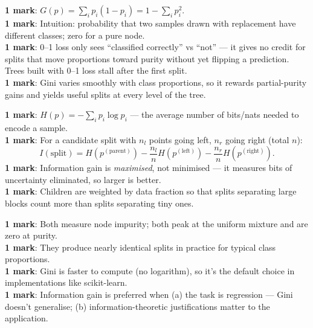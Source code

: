 \documentclass[11pt, a4paper]{article}
\begin{document}
\begin{exambox}
\textbf{1 mark}: $G(p) = \sum_i p_i(1 - p_i) = 1 - \sum_i p_i^2$. \\
\textbf{1 mark}: Intuition: probability that two samples drawn with replacement have different classes; zero for a pure node. \\
\textbf{1 mark}: 0--1 loss only sees ``classified correctly'' vs ``not'' — it gives no credit for splits that move proportions toward purity without yet flipping a prediction. Trees built with 0--1 loss stall after the first split. \\
\textbf{1 mark}: Gini varies smoothly with class proportions, so it rewards partial-purity gains and yields useful splits at every level of the tree.
\end{exambox}

\begin{exambox}
\textbf{1 mark}: $H(p) = -\sum_i p_i \log p_i$ — the average number of bits/nats needed to encode a sample. \\
\textbf{1 mark}: For a candidate split with $n_l$ points going left, $n_r$ going right (total $n$):
\[
I(\text{split}) = H(p^{(\text{parent})}) - \frac{n_l}{n} H(p^{(\text{left})}) - \frac{n_r}{n} H(p^{(\text{right})}).
\]
\textbf{1 mark}: Information gain is \emph{maximised}, not minimised — it measures bits of uncertainty eliminated, so larger is better. \\
\textbf{1 mark}: Children are weighted by data fraction so that splits separating large blocks count more than splits separating tiny ones.
\end{exambox}

\begin{exambox}
\textbf{1 mark}: Both measure node impurity; both peak at the uniform mixture and are zero at purity. \\
\textbf{1 mark}: They produce nearly identical splits in practice for typical class proportions. \\
\textbf{1 mark}: Gini is faster to compute (no logarithm), so it's the default choice in implementations like scikit-learn. \\
\textbf{1 mark}: Information gain is preferred when (a) the task is regression — Gini doesn't generalise; (b) information-theoretic justifications matter to the application.
\end{exambox}
\end{document}
